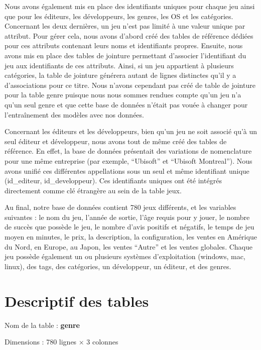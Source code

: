 \documentclass[mstat,12pt]{unswthesis}
\begin{document}
Nous avons également mis en place des identifiants uniques pour chaque jeu ainsi que pour les éditeurs, les développeurs, les genres, les OS et les catégories. Concernant les deux dernières, un jeu n'est pas limité à une valeur unique par attribut. Pour gérer cela, nous avons d'abord créé des tables de référence dédiées pour ces attributs contenant leurs noms et identifiants propres. Ensuite, nous avons mis en place des tables de jointure permettant d'associer l'identifiant du jeu aux identifiants de ces attributs. Ainsi, si un jeu appartient à plusieurs catégories, la table de jointure générera autant de lignes distinctes qu'il y a d'associations pour ce titre. Nous n'avons cependant pas créé de table de jointure pour la table genre puisque nous nous sommes rendues compte qu'un jeu n'a qu'un seul genre et que cette base de données n'était pas vouée à changer pour l'entraînement des modèles avec nos données.

Concernant les éditeurs et les développeurs, bien qu'un jeu ne soit associé qu'à un seul éditeur et développeur, nous avons tout de même créé des tables de référence. En effet, la base de données présentait des variations de nomenclature pour une même entreprise (par exemple, ``Ubisoft'' et ``Ubisoft Montreal''). Nous avons unifié ces différentes appellations sous un seul et même identifiant unique (id\_editeur, id\_developpeur). Ces identifiants uniques ont été intégrés directement comme clé étrangère au sein de la table jeux.

Au final, notre base de données contient 780 jeux différents, et les variables suivantes : le nom du jeu, l'année de sortie, l'âge requis pour y jouer, le nombre de succès que possède le jeu, le nombre d'avis positifs et négatifs, le temps de jeu moyen en minutes, le prix, la description, la configuration, les ventes en Amérique du Nord, en Europe, au Japon, les ventes ``Autre'' et les ventes globales. Chaque jeu possède également un ou plusieurs systèmes d'exploitation (windows, mac, linux), des tags, des catégories, un développeur, un éditeur, et des genres.

\hypertarget{descriptif-des-tables}{%
\section{\textbf{Descriptif des tables}}\label{descriptif-des-tables}}

\vspace{1em}
\noindent Nom de la table : \textbf{genre}

\noindent Dimensions : 780 lignes × 3 colonnes
\end{document}
